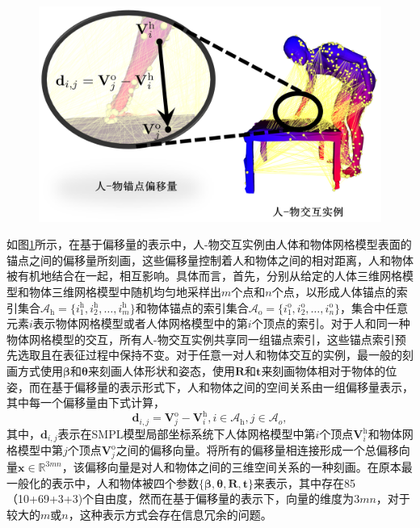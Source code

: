 \begin{figure}[!htbp]
	\centering
	\includegraphics{Img/ho_offsets}
	\label{fig:offset}
\end{figure}

如图\ref{fig:offset}所示，在基于偏移量的表示中，人-物交互实例由人体和物体网格模型表面的锚点之间的偏移量所刻画，这些偏移量控制着人和物体之间的相对距离，人和物体被有机地结合在一起，相互影响。具体而言，首先，分别从给定的人体三维网格模型和物体三维网格模型中随机均匀地采样出$m$个点和$n$个点，以形成人体锚点的索引集合$\mathcal{A}_{\text{h}} = \{ i_1^\text{h}, i_2^\text{h}, \dots, i_m^\text{h} \}$和物体锚点的索引集合$\mathcal{A}_{\text{o}} = \{ i_1^\text{o}, i_2^\text{o}, \dots, i_n^\text{o} \}$，集合中任意元素$i$表示物体网格模型或者人体网格模型中的第$i$个顶点的索引。对于人和同一种物体网格模型的交互，所有人-物交互实例共享同一组锚点索引，这些锚点索引预先选取且在表征过程中保持不变。对于任意一对人和物体交互的实例，最一般的刻画方式使用$\mathbf{\beta}$和$\mathbf{\theta}$来刻画人体形状和姿态，使用$\mathbf{R}$和$\mathbf{t}$来刻画物体相对于物体的位姿，而在基于偏移量的表示形式下，人和物体之间的空间关系由一组偏移量表示，其中每一个偏移量由下式计算，
\begin{equation}\label{eq:offset}
	\mathbf{d}_{i,j} = \mathbf{V}_{j}^{\text{o}} - \mathbf{V}_{i}^{\text{h}}, i \in \mathcal{A}_{\text{h}}, j \in \mathcal{A}_{o},
\end{equation}
其中，$\mathbf{d}_{i,j}$表示在SMPL模型局部坐标系统下人体网格模型中第$i$个顶点$\mathbf{V}_{i}^{\text{h}}$和物体网格模型中第$j$个顶点$\mathbf{V}_{j}^{\text{o}}$之间的偏移向量。将所有的偏移量相连接形成一个总偏移向量$\mathbf{x}\in \mathbb{R}^{3mn}$，该偏移向量是对人和物体之间的三维空间关系的一种刻画。在原本最一般化的表示中，人和物体被四个参数$\{\mathbf{\beta}, \mathbf{\theta}, \mathbf{R},\mathbf{t}\}$来表示，其中存在85（10+69+3+3)个自由度，然而在基于偏移量的表示下，向量的维度为$3mn$，对于较大的$m$或$n$，这种表示方式会存在信息冗余的问题。

